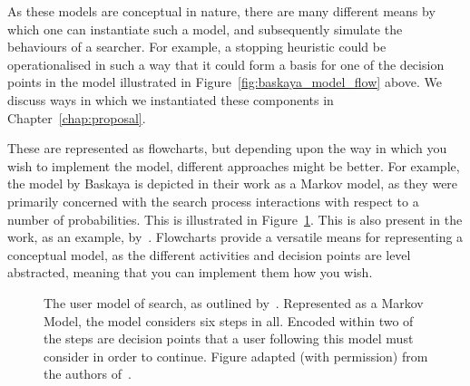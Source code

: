 As these models are conceptual in nature, there are many different means by which one can instantiate such a model, and subsequently simulate the behaviours of a searcher. For example, a stopping heuristic could be operationalised in such a way that it could form a basis for one of the decision points in the model illustrated in Figure~\ref{fig:baskaya_model_flow} above. We discuss ways in which we instantiated these components in Chapter~\ref{chap:proposal}.

\noindent
{} These are represented as flowcharts, but depending upon the way in which you wish to implement the model, different approaches might be better. For example, the model by Baskaya is depicted in their work as a Markov model, as they were primarily concerned with the search process interactions with respect to a number of probabilities. This is illustrated in Figure~\ref{fig:baskaya_model}. This is also present in the work, as an example, by~\cite{tran2017markov_models}. Flowcharts provide a versatile means for representing a conceptual model, as the different activities and decision points are level abstracted, meaning that you can implement them how you wish.

\begin{figure}[t!]
    \centering
    \caption[Markov model of the search process by~\cite{baskaya2013behavioural_factors}]{The user model of search, as outlined by~\citealt{baskaya2013behavioural_factors}. Represented as a Markov Model, the model considers six steps in all. Encoded within two of the steps are decision points that a user following this model must consider in order to continue. Figure adapted (with permission) from the authors of~\citealt{baskaya2013behavioural_factors}.}
    \label{fig:baskaya_model}
\end{figure}

